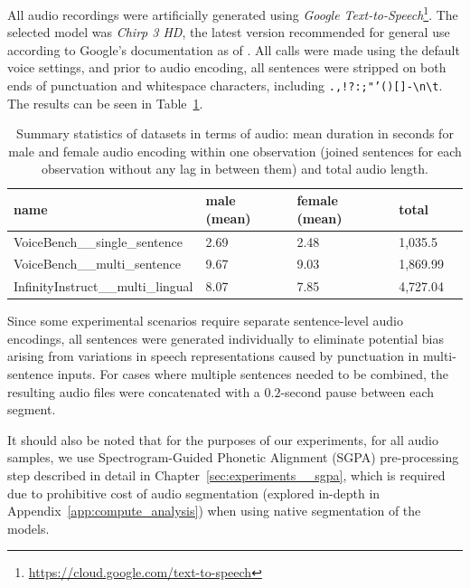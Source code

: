 All audio recordings were artificially generated using \textit{Google Text-to-Speech}\footnote{\url{https://cloud.google.com/text-to-speech}}. The selected model was \textit{Chirp 3 HD}, the latest version recommended for general use according to Google’s documentation as of . All calls were made using the default voice settings, and prior to audio encoding, all sentences were stripped on both ends of punctuation and whitespace characters, including \texttt{.,!?:;"'()[]{}-\textbackslash n\textbackslash t}. The results can be seen in Table~\ref{tab:experiments__audio_pp__summary}.

\begin{table}[h!]
\centering
\caption{Summary statistics of datasets in terms of audio: mean duration in seconds for male and female audio encoding within one observation (joined sentences for each observation without any lag in between them) and total audio length.}

\begin{tabular}{p{5cm} p{1cm} p{1.5cm} p{1.5cm} p{2cm}}
\toprule

\textbf{name} & \textbf{male (mean)} & \textbf{female (mean)} & \textbf{total}  \\
\midrule

VoiceBench\_\_single\_sentence & 2.69 & 2.48 & 1,035.5 \\

VoiceBench\_\_multi\_sentence & 9.67 & 9.03 & 1,869.99 \\

InfinityInstruct\_\_multi\_lingual & 8.07 & 7.85 & 4,727.04 \\

\bottomrule
\end{tabular}
\label{tab:experiments__audio_pp__summary}
\end{table}

Since some experimental scenarios require separate sentence-level audio encodings, all sentences were generated individually to eliminate potential bias arising from variations in speech representations caused by punctuation in multi-sentence inputs. For cases where multiple sentences needed to be combined, the resulting audio files were concatenated with a $0.2$-second pause between each segment.

It should also be noted that for the purposes of our experiments, for all audio samples, we use Spectrogram-Guided Phonetic Alignment (SGPA) pre-processing step described in detail in Chapter~\ref{sec:experiments__sgpa}, which is required due to prohibitive cost of audio segmentation (explored in-depth in Appendix~\ref{app:compute_analysis}) when using native segmentation of the models.

